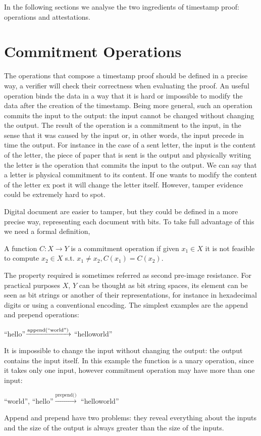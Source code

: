 In the following sections we analyse the two ingredients of timestamp proof: operations and attestations.

\section{Commitment Operations}

The operations that compose a timestamp proof should be defined in a precise way, a verifier will check their correctness when evaluating the proof. An useful operation binds the data in a way that it is hard or impossible to modify the data after the creation of the timestamp. Being more general, such an operation commits the input to the output: the input cannot be changed without changing the output. The result of the operation is a commitment to the input, in the sense that it was caused by the input or, in other words, the input precede in time the output.
For instance in the case of a sent letter, the input is the content of the letter, the piece of paper that is sent is the output and physically writing the letter is the operation that commits the input to the output. We can say that a letter is physical commitment to its content. If one wants to modify the content of the letter ex post it will change the letter itself. However, tamper evidence could be extremely hard to spot.

Digital document are easier to tamper, but they could be defined in a more precise way, representing each document with bits. To take full advantage of this we need a formal definition,
\begin{mydef}
	A function $C:X \rightarrow Y$ is a commitment operation if given $x_1 \in X$ it is not feasible to compute $x_2 \in X$ s.t. $x_1 \neq x_2, C(x_1)=C(x_2)$.
\end{mydef}
The property required is sometimes referred as second pre-image resistance. For practical purposes $X$, $Y$ can be thought as bit string spaces, its element can be seen as bit strings or another of their representations, for instance in hexadecimal digits or using a conventional encoding.
The simplest examples are the append and prepend operations:

\begin{myexample}
	\textquotedblleft hello\textquotedblright $\xrightarrow{\text{append(\textquotedblleft world\textquotedblright)}}$ \textquotedblleft helloworld\textquotedblright
\end{myexample}
It is impossible to change the input without changing the output: the output contains the input itself. In this example the function is a unary operation, since it takes only one input, however commitment operation may have more than one input:
\begin{myexample}
	\textquotedblleft world\textquotedblright, \textquotedblleft hello\textquotedblright $\xrightarrow{\text{prepend()}}$ \textquotedblleft helloworld\textquotedblright
\end{myexample}
Append and prepend have two problems: they reveal everything about the inputs and the size of the output is always greater than the size of the inputs. 

